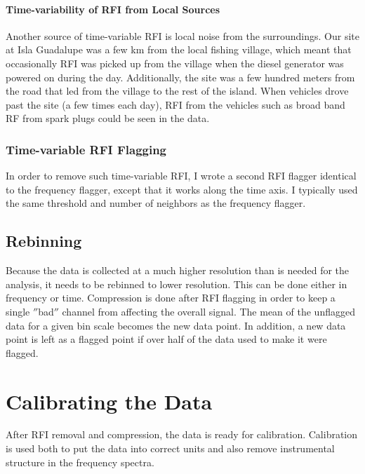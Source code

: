\paragraph{Time-variability of RFI from Local Sources}

Another source of time-variable RFI is local noise from the surroundings. Our site at Isla Guadalupe was a few km from the local fishing village, which meant that occasionally RFI was picked up from the village when the diesel generator was powered on during the day. Additionally, the site was a few hundred meters from the road that led from the village to the rest of the island. When vehicles drove past the site (a few times each day), RFI from the vehicles such as broad band RF from spark plugs could be seen in the data. 

\subsubsection{Time-variable RFI Flagging}

In order to remove such time-variable RFI, I wrote a second RFI flagger identical to the frequency flagger, except that it works along the time axis. I typically used the same threshold and number of neighbors as the frequency flagger. 


\subsection{Rebinning}

Because the data is collected at a much higher resolution than is needed for the analysis, it needs to be rebinned to lower resolution. This can be done either in frequency or time. Compression is done after RFI flagging in order to keep a single $''$bad$''$ channel from affecting the overall signal. The mean of the unflagged data for a given bin scale becomes the new data point. In addition, a new data point is left as a flagged point if over half of the data used to make it were flagged. 



\section{Calibrating the Data}

After RFI removal and compression, the data is ready for calibration. Calibration is used both to put the data into correct units and also remove instrumental structure in the frequency spectra. 


